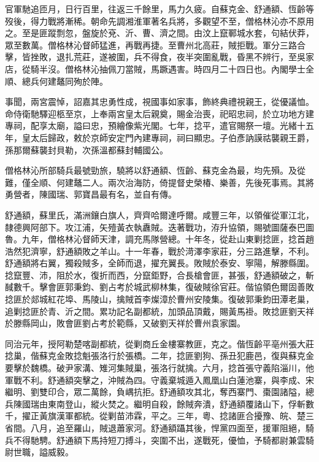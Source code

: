 \begin{pinyinscope}
官軍馳追匝月，日行百里，往返三千餘里，馬力久疲。自蘇克金、舒通額、恆齡等歿後，得力戰將漸稀。朝命先調湘淮軍著名兵將，多觀望不至，僧格林沁亦不原用之。至是匪蹤剽忽，盤旋於兗、沂、曹、濟之間。由汶上竄鄆城水套，句結伏莽，眾至數萬。僧格林沁督師猛進，再戰再捷。至曹州北高莊，賊拒戰。軍分三路合擊，皆挫敗，退扎荒莊，遂被圍，兵不得食，夜半突圍亂戰，昏黑不辨行，至吳家店，從騎半沒。僧格林沁抽佩刀當賊，馬蹶遇害。時四月二十四日也。內閣學士全順、總兵何建鼇同殉於陣。

事聞，兩宮震悼，詔嘉其忠勇性成，視國事如家事，飾終典禮視親王，從優議恤。命侍衛馳驛迎柩至京，上奉兩宮皇太后親奠，賜金治喪，祀昭忠祠，於立功地方建專祠，配享太廟，謚曰忠，預繪像紫光閣。七年，捻平，遣官賜祭一壇。光緒十五年，皇太后歸政，敕於京師安定門內建專祠，祠曰顯忠。子伯彥訥謨祜襲親王爵，孫那爾蘇襲封貝勒，次孫溫都蘇封輔國公。

僧格林沁所部騎兵最號勁旅，驍將以舒通額、恆齡、蘇克金為最，均先殞。及從難，僅全順、何建鼇二人。兩次治海防，倚提督史榮椿、樂善，先後死事焉。其將勇營者，陳國瑞、郭寶昌最有名，並自有傳。

舒通額，蘇里氏，滿洲鑲白旗人，齊齊哈爾達呼爾。咸豐三年，以領催從軍江北，隸德興阿部下。攻江浦，矢殪黃衣執纛賊。迭著戰功，洊升協領，賜號圖薩泰巴圖魯。九年，僧格林沁督師天津，調充馬隊營總。十年冬，從赴山東剿捻匪，捻首趙浩然犯濟寧，舒通額敗之羊山。十一年春，戰於渮澤李家莊，分三路進擊，不利。舒通額將右翼，獨殺賊多，全師而退，擢充翼長。敗賊於泰安、寧陽，解滕縣圍。捻竄豐、沛，阻於水，復折而西，分竄鉅野，合長槍會匪，甚張，舒通額破之，斬馘數千。擊會匪郭秉鈞、劉占考於城武柳林集，復破賊徐官莊。偕協領色爾固善敗捻匪於郯城紅花埠、馬陵山，擒賊首李燦漳於曹州安陵集。復破郭秉鈞田潭老巢，追剿捻匪於青、沂之間。累功記名副都統，加頭品頂戴，賜黃馬褂。敗捻匪劉天祥於滕縣岡山，敗會匪劉占考於範縣，又破劉天祥於曹州袁家園。

同治元年，授阿勒楚喀副都統，從剿商丘金樓寨教匪，克之。偕恆齡平亳州張大莊捻巢，偕蘇克金敗捻魁張洛行於張橋。二年，捻匪劉狗、孫丑犯鹿邑，復與蘇克金要擊於魏橋。破尹家溝、雉河集賊巢，張洛行就擒。六月，捻首張守義陷淄川，他軍戰不利。舒通額突擊之，沖賊為四。守義棄城遁入鳳凰山白蓮池寨，與李成、宋繼明、劉雙印合，眾二萬餘，負嵎抗拒。舒通額攻其北，奪西寨門、棗園諸隘，總兵陳國瑞由東南登山，縱火焚之。繼明自殺，餘賊奔潰，舒通額覆諸山下，俘斬數千，擢正黃旗漢軍都統。從剿苗沛霖，平之。三年，粵、捻諸匪合擾豫、皖、楚三省間。八月，追至羅山，賊退蕭家河。舒通額躡其後，悍黨四面至，援軍阻絕，騎兵不得馳騁。舒通額下馬持短刀搏斗，突圍不出，遂戰死，優恤，予騎都尉兼雲騎尉世職，謚威毅。


\end{pinyinscope}
